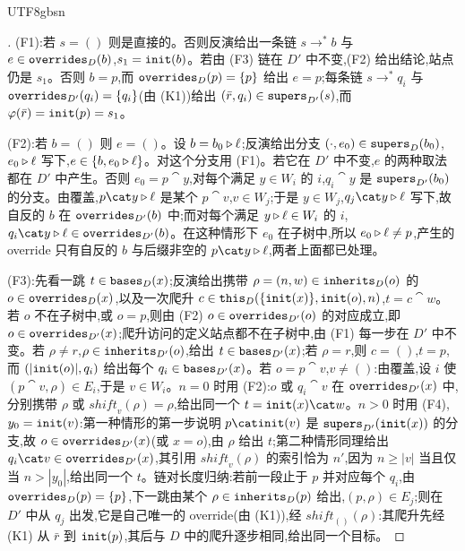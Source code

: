 \begin{CJK*}{UTF8}{gbsn}
\begin{proof}[]
\begin{sloppypar}
(F1):若 $s = ()$ 则是直接的。否则反演给出一条链 $s \to^* b$ 与 $e \in \mathtt{overrides}_D(b)$,$s_1 = \mathtt{init}(b)$。若由 (F3) 链在 $D'$ 中不变,(F2) 给出结论,站点仍是 $s_1$。否则 $b = p$,而 $\mathtt{overrides}_D(p) = \{p\}$ 给出 $e = p$;每条链 $s \to^* q_i$ 与 $\mathtt{overrides}_{D'}(q_i) = \{q_i\}$(由 (K1))给出 $(\bar r, q_i) \in \mathtt{supers}_{D'}(s)$,而 $\varphi(\bar r) = \mathtt{init}(p) = s_1$。

(F2):若 $b = ()$ 则 $e = ()$。设 $b = b_0 \mathbin{\triangleright} \ell$;反演给出分支 $(\cdot, e_0) \in \mathtt{supers}_D(b_0)$,$e_0 \mathbin{\triangleright} \ell$ 写下,$e \in \{b, e_0 \mathbin{\triangleright} \ell\}$。对这个分支用 (F1)。若它在 $D'$ 中不变,$e$ 的两种取法都在 $D'$ 中产生。否则 $e_0 = p \cat y$,对每个满足 $y \in W_i$ 的 $i$,$q_i \cat y$ 是 $\mathtt{supers}_{D'}(b_0)$ 的分支。由覆盖,$p \cat y \snoc \ell$ 是某个 $p \cat v$,$v \in W_j$;于是 $y \in W_j$,$q_j \cat y \snoc \ell$ 写下,故自反的 $b$ 在 $\mathtt{overrides}_{D'}(b)$ 中;而对每个满足 $y \mathbin{\triangleright} \ell \in W_i$ 的 $i$,$q_i \cat y \snoc \ell \in \overrides_{D'}(b)$。在这种情形下 $e_0$ 在子树中,所以 $e_0 \mathbin{\triangleright} \ell \ne p$,产生的 override 只有自反的 $b$ 与后缀非空的 $p \cat y \snoc \ell$,两者上面都已处理。

(F3):先看一跳 $t \in \mathtt{bases}_D(x)$;反演给出携带 $\rho = (n, w) \in \mathtt{inherits}_D(o)$ 的 $o \in \mathtt{overrides}_D(x)$,以及一次爬升 $c \in \mathtt{this}_D(\{\mathtt{init}(x)\}, \mathtt{init}(o), n)$,$t = c \cat w$。若 $o$ 不在子树中,或 $o = p$,则由 (F2) $o \in \mathtt{overrides}_{D'}(o)$ 的对应成立,即 $o \in \mathtt{overrides}_{D'}(x)$;爬升访问的定义站点都不在子树中,由 (F1) 每一步在 $D'$ 中不变。若 $\rho \ne r$,$\rho \in \mathtt{inherits}_{D'}(o)$,给出 $t \in \mathtt{bases}_{D'}(x)$;若 $\rho = r$,则 $c = ()$,$t = p$,而 $(|\mathtt{init}(o)|, q_i)$ 给出每个 $q_i \in \mathtt{bases}_{D'}(x)$。若 $o = p \cat v$,$v \ne ()$:由覆盖,设 $i$ 使 $(p \cat v, \rho) \in E_i$,于是 $v \in W_i$。$n = 0$ 时用 (F2):$o$ 或 $q_i \cat v$ 在 $\mathtt{overrides}_{D'}(x)$ 中,分别携带 $\rho$ 或 $\mathit{shift}_v(\rho) = \rho$,给出同一个 $t = \init(x) \cat w$。$n > 0$ 时用 (F4),$y_0 = \mathtt{init}(v)$:第一种情形的第一步说明 $p \cat \init(v)$ 是 $\mathtt{supers}_{D'}(\mathtt{init}(x))$ 的分支,故 $o \in \mathtt{overrides}_{D'}(x)$(或 $x = o$),由 $\rho$ 给出 $t$;第二种情形同理给出 $q_i \cat v \in \overrides_{D'}(x)$,其引用 $\mathit{shift}_v(\rho)$ 的索引恰为 $n'$,因为 $n \ge |v|$ 当且仅当 $n > |y_0|$,给出同一个 $t$。链对长度归纳:若前一段止于 $p$ 并对应每个 $q_i$,由 $\mathtt{overrides}_D(p) = \{p\}$,下一跳由某个 $\rho \in \mathtt{inherits}_D(p)$ 给出,$(p, \rho) \in E_j$;则在 $D'$ 中从 $q_j$ 出发,它是自己唯一的 override(由 (K1)),经 $\mathit{shift}_{()}(\rho)$:其爬升先经 (K1) 从 $\bar r$ 到 $\mathtt{init}(p)$,其后与 $D$ 中的爬升逐步相同,给出同一个目标。


\end{sloppypar}
\end{proof}
\end{CJK*}
